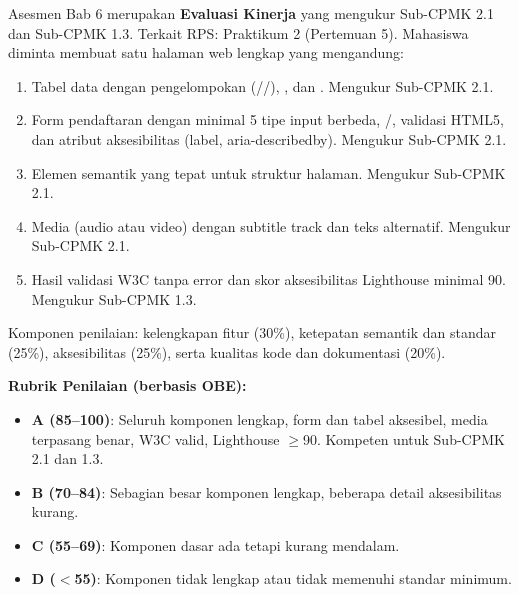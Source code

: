 \documentclass[../main.tex]{subfiles}
\begin{document}
\begin{asesmen}
Asesmen Bab 6 merupakan \textbf{Evaluasi Kinerja} yang mengukur Sub-CPMK 2.1 dan Sub-CPMK 1.3. Terkait RPS: Praktikum 2 (Pertemuan 5). Mahasiswa diminta membuat satu halaman web lengkap yang mengandung:
\begin{enumerate}
  \item Tabel data dengan pengelompokan (//), , dan . Mengukur Sub-CPMK 2.1.
  \item Form pendaftaran dengan minimal 5 tipe input berbeda, /, validasi HTML5, dan atribut aksesibilitas (label, aria-describedby). Mengukur Sub-CPMK 2.1.
  \item Elemen semantik yang tepat untuk struktur halaman. Mengukur Sub-CPMK 2.1.
  \item Media (audio atau video) dengan subtitle track dan teks alternatif. Mengukur Sub-CPMK 2.1.
  \item Hasil validasi W3C tanpa error dan skor aksesibilitas Lighthouse minimal 90. Mengukur Sub-CPMK 1.3.
\end{enumerate}

Komponen penilaian: kelengkapan fitur (30\%), ketepatan semantik dan standar (25\%), aksesibilitas (25\%), serta kualitas kode dan dokumentasi (20\%).

\textbf{Rubrik Penilaian (berbasis OBE):}
\begin{itemize}
  \item \textbf{A (85--100)}: Seluruh komponen lengkap, form dan tabel aksesibel, media terpasang benar, W3C valid, Lighthouse $\geq$90. Kompeten untuk Sub-CPMK 2.1 dan 1.3.
  \item \textbf{B (70--84)}: Sebagian besar komponen lengkap, beberapa detail aksesibilitas kurang.
  \item \textbf{C (55--69)}: Komponen dasar ada tetapi kurang mendalam.
  \item \textbf{D ($<$55)}: Komponen tidak lengkap atau tidak memenuhi standar minimum.
\end{itemize}
\end{asesmen}
\end{document}
